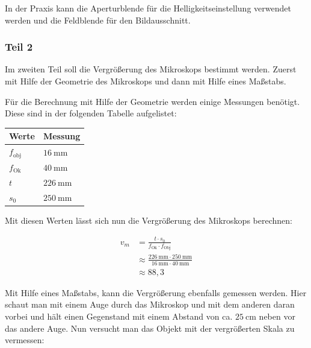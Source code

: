             In der Praxis kann die Aperturblende für die Helligkeitseinstellung verwendet werden und die Feldblende für den Bildausschnitt.
        
        \subsubsection{Teil 2}

            Im zweiten Teil soll die Vergrößerung des Mikroskops bestimmt werden. Zuerst mit Hilfe der Geometrie des Mikroskops und dann mit Hilfe eines Maßstabs.

            Für die Berechnung mit Hilfe der Geometrie werden einige Messungen benötigt. Diese sind in der folgenden Tabelle aufgelistet:

            \begin{table}[h]
                \begin{center}
                    \begin{tabular}{|l|l|}
                        \hline
                        Werte & Messung\\
                        \hline
                        $f_{\mathrm{obj}}$ & $16\ \mathrm{mm}$\\
                        $f_{\mathrm{Ok}}$ & $40\ \mathrm{mm}$\\
                        $t$ & $226\ \mathrm{mm}$\\
                        $s_{0}$ & $250\ \mathrm{mm}$\\
                        \hline
                    \end{tabular}
                \end{center}
            \end{table}

            Mit diesen Werten lässt sich nun die Vergrößerung des Mikroskops berechnen:

            $$
            \begin{aligned}
                v_{m} &= \frac{t \cdot s_{0}}{f_{\mathrm{Ok}} \cdot f_{\mathrm{Obj}}}\\
                &\approx \frac{226\ \mathrm{mm} \cdot 250\ \mathrm{mm}}{16\ \mathrm{mm} \cdot 40\ \mathrm{mm}}\\
                &\approx 88,3
            \end{aligned}
            $$

            Mit Hilfe eines Maßstabs, kann die Vergrößerung ebenfalls gemessen werden. Hier schaut man mit einem Auge durch das Mikroskop und mit dem anderen daran vorbei und hält einen Gegenstand mit einem Abstand von ca. $25\ \mathrm{cm}$ neben vor das andere Auge. Nun versucht man das Objekt mit der vergrößerten Skala zu vermessen:

